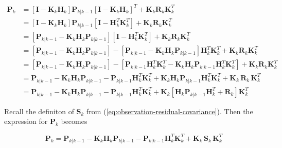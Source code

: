 \begin{equation*}
    \begin{aligned}
        \mathbf{P}_{k} &= \left[ \mathbf{I} - \mathbf{K}_k \mathbf{H}_k \right] \mathbf{P}_{k|k-1} \left[ \mathbf{I} - \mathbf{K}_k \mathbf{H}_k \right]^T
          + \mathbf{K}_k \mathbf{R}_k \mathbf{K}_k^T \\
        &= \left[ \mathbf{I} - \mathbf{K}_k \mathbf{H}_k \right] \mathbf{P}_{k|k-1} \left[ \mathbf{I} - \mathbf{H}_k^T \mathbf{K}_k^T \right]
          + \mathbf{K}_k \mathbf{R}_k \mathbf{K}_k^T \\
        &= \left[ \mathbf{P}_{k|k-1} - \mathbf{K}_k \mathbf{H}_k \mathbf{P}_{k|k-1} \right] \left[ \mathbf{I} - \mathbf{H}_k^T \mathbf{K}_k^T \right]
          + \mathbf{K}_k \mathbf{R}_k \mathbf{K}_k^T \\
        &= \left[ \mathbf{P}_{k|k-1} - \mathbf{K}_k \mathbf{H}_k \mathbf{P}_{k|k-1} \right]
          - \left[ \mathbf{P}_{k|k-1} - \mathbf{K}_k \mathbf{H}_k \mathbf{P}_{k|k-1} \right] \mathbf{H}_k^T \mathbf{K}_k^T
          + \mathbf{K}_k \mathbf{R}_k \mathbf{K}_k^T \\
        &= \left[ \mathbf{P}_{k|k-1} - \mathbf{K}_k \mathbf{H}_k \mathbf{P}_{k|k-1} \right]
          - \left[ \mathbf{P}_{k|k-1} \mathbf{H}_k^T \mathbf{K}_k^T - \mathbf{K}_k \mathbf{H}_k \mathbf{P}_{k|k-1} \mathbf{H}_k^T \mathbf{K}_k^T \right]
          + \mathbf{K}_k \mathbf{R}_k \mathbf{K}_k^T \\
        &= \mathbf{P}_{k|k-1} - \mathbf{K}_k \mathbf{H}_k \mathbf{P}_{k|k-1}
          - \mathbf{P}_{k|k-1} \mathbf{H}_k^T \mathbf{K}_k^T + \mathbf{K}_k \mathbf{H}_k \mathbf{P}_{k|k-1} \mathbf{H}_k^T \mathbf{K}_k^T
          + \mathbf{K}_k \, \mathbf{R}_k \, \mathbf{K}_k^T \\
        &= \mathbf{P}_{k|k-1} - \mathbf{K}_k \mathbf{H}_k \mathbf{P}_{k|k-1} - \mathbf{P}_{k|k-1} \mathbf{H}_k^T \mathbf{K}_k^T
          + \mathbf{K}_k \left[ \mathbf{H}_k \mathbf{P}_{k|k-1} \mathbf{H}_k^T + \mathbf{R}_k \right] \mathbf{K}_k^T
    \end{aligned}
\end{equation*}

Recall the definiton of $\mathbf{S}_k$ from (\ref{eq:observation-residual-covariance}).
Then the expression for $\mathbf{P}_k$ becomes

\begin{equation}
    \mathbf{P}_{k} = \mathbf{P}_{k|k-1} - \mathbf{K}_k \mathbf{H}_k \mathbf{P}_{k|k-1} - \mathbf{P}_{k|k-1} \mathbf{H}_k^T \mathbf{K}_k^T
    + \mathbf{K}_k \, \mathbf{S}_k \, \mathbf{K}_k^T
    \label{eq:state-correction-covariance-interim}
\end{equation}


